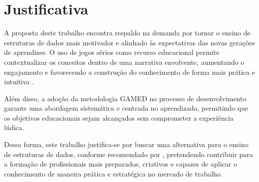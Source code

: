 \section{Justificativa}

A proposta deste trabalho encontra respaldo na demanda por tornar o
ensino de estruturas de dados mais motivador e alinhado às expectativas das
novas gerações de aprendizes. O uso de jogos sérios como recurso educacional
permite contextualizar os conceitos dentro de uma narrativa envolvente,
aumentando o engajamento e favorecendo a construção do conhecimento de forma
mais prática e intuitiva \cite{mouaheb2012serious}.

Além disso, a adoção da metodologia GAMED \cite{aslan2015gamed} no processo de desenvolvimento
garante uma abordagem sistemática e centrada no aprendizado, permitindo que os
objetivos educacionais sejam alcançados sem comprometer a experiência lúdica.

Dessa forma, este trabalho justifica-se por buscar uma alternativa para o
ensino de estruturas de dados, conforme recomendado por
\cite{mtaho2024difficulties}, pretendendo contribuir para a formação de
profissionais mais preparados, criativos e capazes de aplicar o conhecimento de
maneira prática e estratégica no mercado de trabalho.
